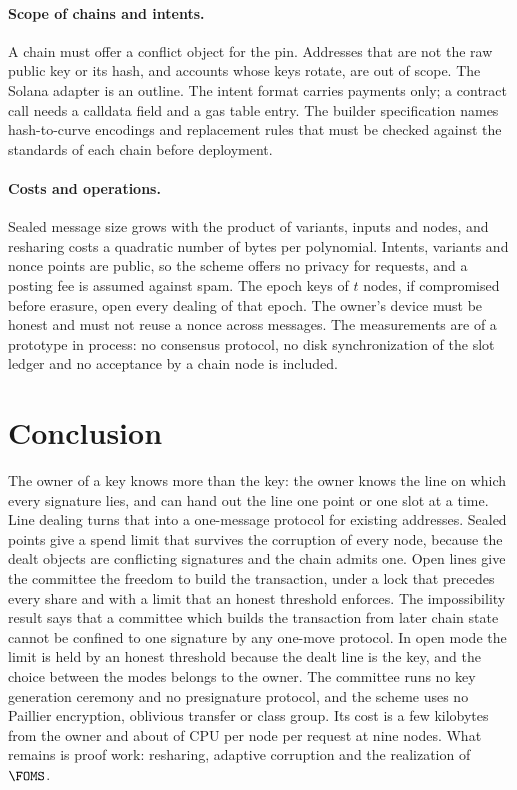 \paragraph{Scope of chains and intents.} A chain must offer a conflict object for the pin. Addresses that are not the raw public key or its hash, and accounts whose keys rotate, are out of scope. The Solana adapter is an outline. The intent format carries payments only; a contract call needs a calldata field and a gas table entry. The builder specification names hash-to-curve encodings and replacement rules that must be checked against the standards of each chain before deployment.

\paragraph{Costs and operations.} Sealed message size grows with the product of variants, inputs and nodes, and resharing costs a quadratic number of bytes per polynomial. Intents, variants and nonce points are public, so the scheme offers no privacy for requests, and a posting fee is assumed against spam. The epoch keys of $t$ nodes, if compromised before erasure, open every dealing of that epoch. The owner's device must be honest and must not reuse a nonce across messages. The measurements are of a prototype in process: no consensus protocol, no disk synchronization of the slot ledger and no acceptance by a chain node is included.

\section{Conclusion}\label{sec:conclusion}

The owner of a key knows more than the key: the owner knows the line on which every signature lies, and can hand out the line one point or one slot at a time. Line dealing turns that into a one-message protocol for existing addresses. Sealed points give a spend limit that survives the corruption of every node, because the dealt objects are conflicting signatures and the chain admits one. Open lines give the committee the freedom to build the transaction, under a lock that precedes every share and with a limit that an honest threshold enforces. The impossibility result says that a committee which builds the transaction from later chain state cannot be confined to one signature by any one-move protocol. In open mode the limit is held by an honest threshold because the dealt line is the key, and the choice between the modes belongs to the owner. The committee runs no key generation ceremony and no presignature protocol, and the scheme uses no Paillier encryption, oblivious transfer or class group. Its cost is a few kilobytes from the owner and about \nineNodeMicrosLow{}\us{} of CPU per node per request at nine nodes. What remains is proof work: resharing, adaptive corruption and the realization of $\FOMS$.
